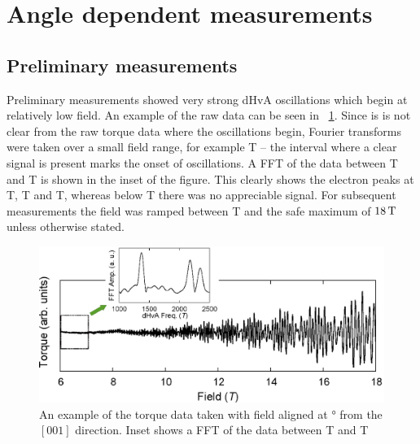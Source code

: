 
\section{Angle dependent measurements}
    \label{Sec:3:AngleDependentMeasurements}

\subsection{Preliminary measurements}

Preliminary measurements showed very strong dHvA oscillations which begin at relatively low field.  An example of the raw data can be seen in \fig~\ref{Fig:3:RawOscillations}. Since is is not clear from the raw torque data where the oscillations begin, Fourier transforms were taken over a small field range, for example \unit[1]{T} -- the interval where a clear signal is present marks the onset of oscillations. A FFT of the data between \unit[6]{T} and \unit[7]{T} is shown in the inset of the figure. This clearly shows the electron peaks at \unit[1370]{T}, \unit[2175]{T} and \unit[2343]{T}, whereas below \unit[6]{T} there was no appreciable signal. For subsequent measurements the field was ramped between \unit[6]{T} and the safe maximum of $\unit[18]{T}$ unless otherwise stated.
\begin{figure}[h!]
    \begin{center}
        \includegraphics[scale=0.7]{Chapter3-dHvABaFe2P2/Figures/AngleDepMeasurements/RawOscillations/RawOscillations}
        \caption{An example of the torque data taken with field aligned at \unit[9]{\degree} from the $[001]$ direction. Inset shows a FFT of the data between \unit[6]{T} and \unit[8]{T}}
        \label{Fig:3:RawOscillations}
    \end{center}
\end{figure}


